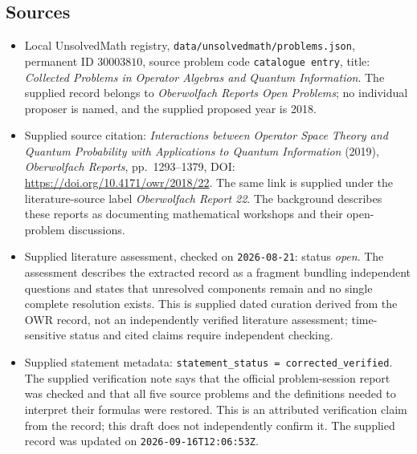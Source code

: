 \documentclass[11pt]{article}
\begin{document}
\subsection{Sources}
\begin{itemize}
\item Local UnsolvedMath registry, \texttt{data/unsolvedmath/problems.json}, permanent ID \(30003810\), source problem code \texttt{catalogue entry}, title: \emph{Collected Problems in Operator Algebras and Quantum Information}. The supplied record belongs to \emph{Oberwolfach Reports Open Problems}; no individual proposer is named, and the supplied proposed year is 2018.
\item Supplied source citation: \emph{Interactions between Operator Space Theory and Quantum Probability with Applications to Quantum Information} (2019), \emph{Oberwolfach Reports}, pp.~1293--1379, DOI: \url{https://doi.org/10.4171/owr/2018/22}. The same link is supplied under the literature-source label \emph{Oberwolfach Report 22}. The background describes these reports as documenting mathematical workshops and their open-problem discussions.
\item Supplied literature assessment, checked on \texttt{2026-08-21}: status \emph{open}. The assessment describes the extracted record as a fragment bundling independent questions and states that unresolved components remain and no single complete resolution exists. This is supplied dated curation derived from the OWR record, not an independently verified literature assessment; time-sensitive status and cited claims require independent checking.
\item Supplied statement metadata: \texttt{statement\_status = corrected\_verified}. The supplied verification note says that the official problem-session report was checked and that all five source problems and the definitions needed to interpret their formulas were restored. This is an attributed verification claim from the record; this draft does not independently confirm it. The supplied record was updated on \texttt{2026-09-16T12:06:53Z}.
\end{itemize}
\end{document}
